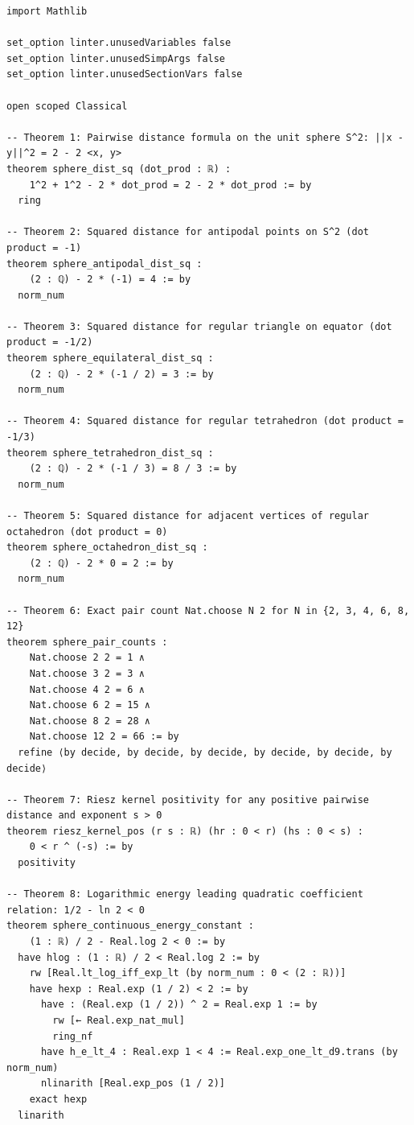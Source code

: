 \documentclass[11pt,a4paper]{article}
\theoremstyle{definition}
\begin{document}
\begin{lstlisting}[language=lean4, caption={Machine-Checked Formal Proofs in Lean 4 (\texttt{Smale07SphereEnergy.lean})}]
import Mathlib

set_option linter.unusedVariables false
set_option linter.unusedSimpArgs false
set_option linter.unusedSectionVars false

open scoped Classical

-- Theorem 1: Pairwise distance formula on the unit sphere S^2: ||x - y||^2 = 2 - 2 <x, y>
theorem sphere_dist_sq (dot_prod : ℝ) :
    1^2 + 1^2 - 2 * dot_prod = 2 - 2 * dot_prod := by
  ring

-- Theorem 2: Squared distance for antipodal points on S^2 (dot product = -1)
theorem sphere_antipodal_dist_sq :
    (2 : ℚ) - 2 * (-1) = 4 := by
  norm_num

-- Theorem 3: Squared distance for regular triangle on equator (dot product = -1/2)
theorem sphere_equilateral_dist_sq :
    (2 : ℚ) - 2 * (-1 / 2) = 3 := by
  norm_num

-- Theorem 4: Squared distance for regular tetrahedron (dot product = -1/3)
theorem sphere_tetrahedron_dist_sq :
    (2 : ℚ) - 2 * (-1 / 3) = 8 / 3 := by
  norm_num

-- Theorem 5: Squared distance for adjacent vertices of regular octahedron (dot product = 0)
theorem sphere_octahedron_dist_sq :
    (2 : ℚ) - 2 * 0 = 2 := by
  norm_num

-- Theorem 6: Exact pair count Nat.choose N 2 for N in {2, 3, 4, 6, 8, 12}
theorem sphere_pair_counts :
    Nat.choose 2 2 = 1 ∧
    Nat.choose 3 2 = 3 ∧
    Nat.choose 4 2 = 6 ∧
    Nat.choose 6 2 = 15 ∧
    Nat.choose 8 2 = 28 ∧
    Nat.choose 12 2 = 66 := by
  refine ⟨by decide, by decide, by decide, by decide, by decide, by decide⟩

-- Theorem 7: Riesz kernel positivity for any positive pairwise distance and exponent s > 0
theorem riesz_kernel_pos (r s : ℝ) (hr : 0 < r) (hs : 0 < s) :
    0 < r ^ (-s) := by
  positivity

-- Theorem 8: Logarithmic energy leading quadratic coefficient relation: 1/2 - ln 2 < 0
theorem sphere_continuous_energy_constant :
    (1 : ℝ) / 2 - Real.log 2 < 0 := by
  have hlog : (1 : ℝ) / 2 < Real.log 2 := by
    rw [Real.lt_log_iff_exp_lt (by norm_num : 0 < (2 : ℝ))]
    have hexp : Real.exp (1 / 2) < 2 := by
      have : (Real.exp (1 / 2)) ^ 2 = Real.exp 1 := by
        rw [← Real.exp_nat_mul]
        ring_nf
      have h_e_lt_4 : Real.exp 1 < 4 := Real.exp_one_lt_d9.trans (by norm_num)
      nlinarith [Real.exp_pos (1 / 2)]
    exact hexp
  linarith
\end{lstlisting}
\end{document}
